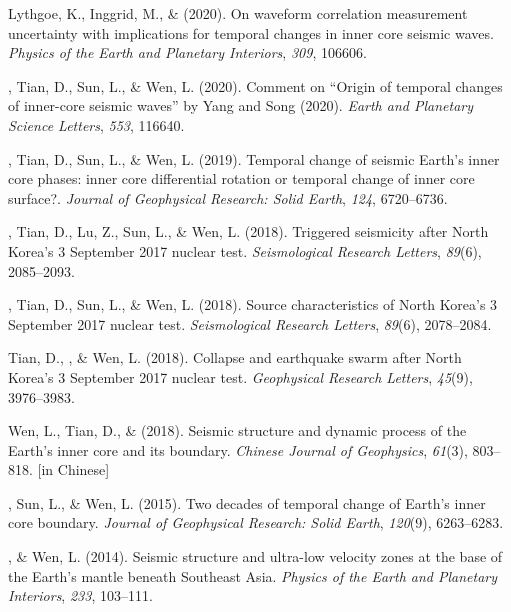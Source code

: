 \begin{etaremune}
    Lythgoe, K., Inggrid, M., \& \Yao (2020).
    On waveform correlation measurement uncertainty with implications for temporal changes in inner core seismic waves.
    \textit{Physics of the Earth and Planetary Interiors}, \textit{309}, 106606.
\item
    \Yao\CS, Tian, D., Sun, L., \& Wen, L. (2020).
    Comment on “Origin of temporal changes of inner-core seismic waves” by Yang and Song (2020).
    \textit{Earth and Planetary Science Letters}, \textit{553}, 116640.
\item
    \Yao\CS, Tian, D., Sun, L., \& Wen, L. (2019).
    Temporal change of seismic Earth's inner core phases: inner core differential rotation or temporal change of inner core surface?.
    \textit{Journal of Geophysical Research: Solid Earth}, \textit{124}, 6720--6736.
\item
    \Yao\CS, Tian, D., Lu, Z., Sun, L., \& Wen, L. (2018).
    Triggered seismicity after North Korea's 3 September 2017 nuclear test.
    \textit{Seismological Research Letters}, \textit{89}(6), 2085--2093.
\item
    \Yao\CS, Tian, D., Sun, L., \& Wen, L. (2018).
	Source characteristics of North Korea's 3 September 2017 nuclear test.
    \textit{Seismological Research Letters}, \textit{89}(6), 2078--2084.
\item
    Tian, D., \Yao\CF, \& Wen, L. (2018).
    Collapse and earthquake swarm after North Korea's 3 September 2017 nuclear test.
    \textit{Geophysical Research Letters}, \textit{45}(9), 3976--3983.
\item
    Wen, L., Tian, D., \& \Yao (2018).
    Seismic structure and dynamic process of the Earth's inner core and its boundary.
    \textit{Chinese Journal of Geophysics}, \textit{61}(3), 803--818.
     [in Chinese]
\item
    \Yao\CS, Sun, L., \& Wen, L. (2015).
    Two decades of temporal change of Earth's inner core boundary.
    \textit{Journal of Geophysical Research: Solid Earth}, \textit{120}(9), 6263--6283.
\item
    \Yao\CS, \& Wen, L. (2014).
    Seismic structure and ultra-low velocity zones at the base of the Earth's mantle beneath Southeast Asia.
    \textit{Physics of the Earth and Planetary Interiors}, \textit{233}, 103--111.
\end{etaremune}


